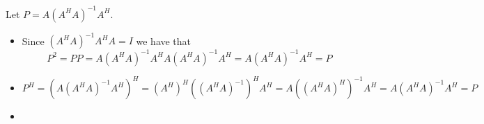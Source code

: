 \documentclass[12pt]{article}
\newenvironment{problem}[2][Problem]{\begin{trivlist}
\item[\hskip \labelsep {\bfseries #1}\hskip \labelsep {\bfseries #2}]}{\end{trivlist}}
\begin{document}
\begin{problem}{37.} 
\end{problem}

\begin{problem}{47.} Let $P = A(A^HA)^{-1}A^H$.
\begin{itemize}
\item [(i)]  Since $(A^HA)^{-1}A^HA= I$ we have that $$P^2 =PP= A(A^HA)^{-1}A^HA(A^HA)^{-1}A^H = A(A^HA)^{-1}A^H = P$$
\item [(ii)] $P^H = (A(A^HA)^{-1}A^H)^H = (A^H)^H ((A^HA)^{-1})^H A^H = A ((A^HA)^H)^{-1}A^H = A(A^HA)^{-1}A^H = P$
\item [(iii)] 
\end{itemize} 
\end{problem}
\end{document}
